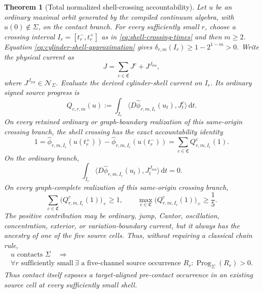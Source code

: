 \documentclass[11pt]{article}
\numberwithin{section}{part}
\theoremstyle{plain}
\newtheorem{theorem}{Theorem}[section]
\theoremstyle{definition}
\theoremstyle{remark}
\newcommand{\dd}{\,\mathrm d}
\newcommand{\Res}{J_{\mathrm{res}}}
\newcommand{\Channels}{\mathfrak C}
\newcommand{\Null}{\mathscr N}
\begin{document}
\begin{theorem}[Total normalized shell-crossing accountability]
\label{thm:deterministic-prospective-accountability}
Let \(u\) be an ordinary maximal orbit generated by the compiled continuum
algebra, with \(u(0)\notin\Sigma\), on the contact branch.  For every
sufficiently small \(r\), choose a crossing interval
\(I_r=[t_r^-,t_r^+]\) as in \eqref{eq:shell-crossing-times} and then
\(m\ge2\).  Equation \eqref{eq:cylinder-shell-approximation} gives
\(\delta_{r,m}(I_r)\ge1-2^{1-m}>0\).  Write the physical current as
\[
 J=\sum_{c\in\Channels}J^c+J^{\Res},
\]
where \(J^{\Res}\in\Null_\Sigma\).  Evaluate the derived cylinder-shell
current on \(I_r\).  Its ordinary signed source progress is
\begin{equation}
 \label{eq:shell-source-progress}
 Q_{c,r,m}(u)
 :=\int_{I_r}
 \langle D\widehat\phi_{r,m,I_r}(u_t),J_t^c\rangle\dd t.
\end{equation}
On every retained ordinary or graph-boundary realization of this same-origin
crossing branch, the shell crossing has the exact accountability identity
\begin{equation}
 \label{eq:deterministic-prospective-factorization}
 \boxed{
 1
 =\widehat\phi_{r,m,I_r}(u(t_r^+))
  -\widehat\phi_{r,m,I_r}(u(t_r^-))
 =\sum_{c\in\Channels}Q^c_{r,m,I_r}(1).}
\end{equation}
On the ordinary branch,
\begin{equation}
 \label{eq:residual-shell-progress-zero}
 \int_{I_r}
 \langle D\widehat\phi_{r,m,I_r}(u_t),J_t^{\Res}\rangle\dd t=0.
\end{equation}
On every graph-complete realization of this same-origin crossing branch,
\begin{equation}
 \label{eq:deterministic-source-extraction}
 \sum_{c\in\Channels}\bigl(Q^c_{r,m,I_r}(1)\bigr)_+\ge1,
 \qquad
 \max_{c\in\Channels}\bigl(Q^c_{r,m,I_r}(1)\bigr)_+
 \ge\frac15.
\end{equation}
The positive contribution may be ordinary, jump, Cantor, oscillation,
concentration, exterior, or variation-boundary current, but it always has the
ancestry of one of the five source cells.  Thus, without requiring a classical
chain rule,
\begin{equation}
 \label{eq:contact-implies-aligned-current}
 \boxed{\begin{gathered}
 u\text{ contacts }\Sigma\quad\Longrightarrow\\
 \forall r\text{ sufficiently small}\ \exists\text{ a five-channel source
 occurrence }R_r:\operatorname{Prog}_\Sigma(R_r)>0.
 \end{gathered}}
\end{equation}
Thus contact itself exposes a target-aligned pre-contact occurrence in an
existing source cell at every sufficiently small shell.
\end{theorem}
\end{document}
